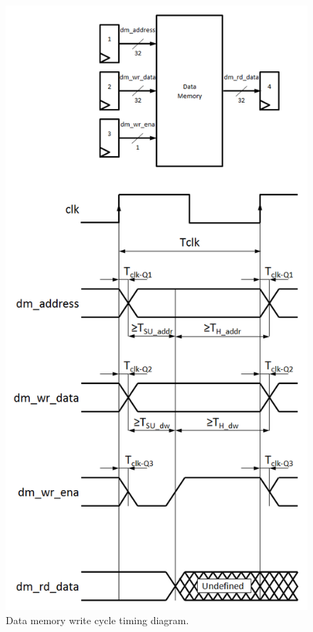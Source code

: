 \begin{figure}
\begin{center}
\includegraphics[scale=0.55]{./figures/dm_wr_timing.png}
\end{center}
\caption{Data memory write cycle timing diagram.}
\label{fig:dm_wr_timing}
\end{figure}

